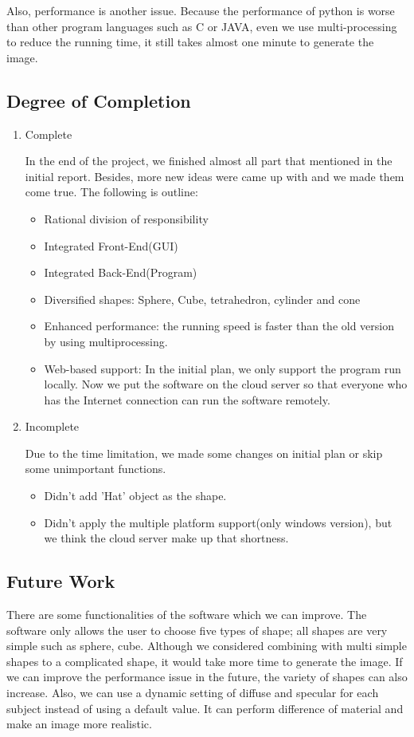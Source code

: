 \documentclass[a4paper, 12pt]{article}
\begin{document}
Also, performance is another issue. Because the performance of python is worse than other program languages such as C or JAVA, even we use multi-processing to reduce the running time, it still takes almost one minute to generate the image.

\subsection{Degree of Completion}
\begin{enumerate}
\item Complete

In the end of the project, we finished almost all part that mentioned in the initial report. Besides, more new ideas were came up with and we made them come true. The following is outline:
\begin{itemize}
\item Rational division of responsibility
\item Integrated Front-End(GUI)
\item Integrated Back-End(Program)
\item Diversified shapes: Sphere, Cube, tetrahedron, cylinder and cone
\item Enhanced performance: the running speed is faster than the old version by using multiprocessing.
\item Web-based support: In the initial plan, we only support the program run locally. Now we put the software on the cloud server so that everyone who has the Internet connection can run the software remotely.
\end{itemize}
\item Incomplete

Due to the time limitation, we made some changes on initial plan or skip some unimportant functions.
\begin{itemize}
\item Didn't add 'Hat' object as the shape.
\item Didn't apply the multiple platform support(only windows version), but we think the cloud server make up that shortness.
\end{itemize}
\end{enumerate}


\subsection{Future Work}
There are some functionalities of the software which we can improve. The software only allows the user to choose five types of shape; all shapes are very simple such as sphere, cube. Although we considered combining with multi simple shapes to a complicated shape, it would take more time to generate the image. If we can improve the performance issue in the future, the variety of shapes can also increase. Also, we can use a dynamic setting of diffuse and specular for each subject instead of using a default value. It can perform difference of material and make an image more realistic. 
\end{document}
